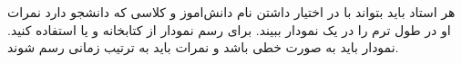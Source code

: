 هر استاد باید بتواند با در اختیار داشتن نام دانش‌اموز و کلاسی که دانشجو دارد نمرات او در طول ترم را  در یک نمودار ببیند. برای رسم 
نمودار از کتابخانه  و یا  استفاده کنید. نمودار باید به صورت خطی باشد و نمرات باید به ترتیب زمانی رسم شوند.     
